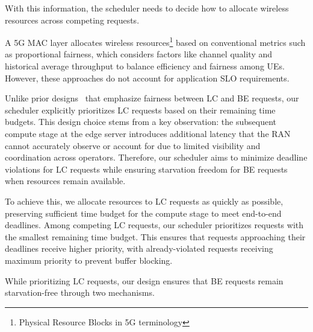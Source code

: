 With this information, the scheduler needs to decide how to allocate wireless resources across competing requests.

A 5G MAC layer allocates wireless resources\footnote{Physical Resource Blocks in 5G terminology} based on conventional metrics such as proportional fairness, which considers factors like channel quality and historical average throughput to balance efficiency and fairness among UEs.
However, these approaches do not account for application SLO requirements.

Unlike prior designs~\cite{xu2022tutti,arma:mobisys25} that emphasize fairness between LC and BE requests, our scheduler explicitly prioritizes LC requests based on their remaining time budgets.
This design choice stems from a key observation: the subsequent compute stage at the edge server introduces additional latency that the RAN cannot accurately observe or account for due to limited visibility and coordination across operators.
Therefore, our scheduler aims to minimize deadline violations for LC requests while ensuring starvation freedom for BE requests when resources remain available.

To achieve this, we allocate resources to LC requests as quickly as possible, preserving sufficient time budget for the compute stage to meet end-to-end deadlines.
Among competing LC requests, our scheduler prioritizes requests with the smallest remaining time budget.
This ensures that requests approaching their deadlines receive higher priority, with already-violated requests receiving maximum priority to prevent buffer blocking.

While prioritizing LC requests, our design ensures that BE requests remain starvation-free through two mechanisms.
